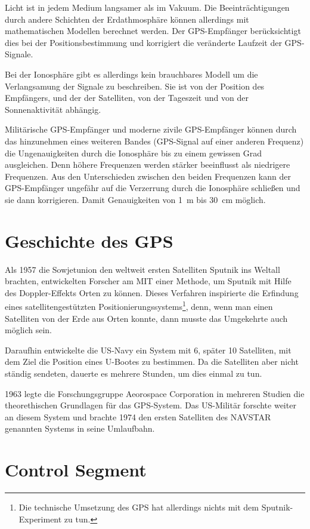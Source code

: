 \documentclass[12pt,a4paper]{scrartcl}
\begin{document}
Licht ist in jedem Medium langsamer als im Vakuum. Die Beeinträchtigungen durch andere Schichten der Erdathmosphäre können allerdings mit mathematischen Modellen berechnet werden. Der GPS-Empfänger berücksichtigt dies bei der Positionsbestimmung und korrigiert die veränderte Laufzeit der GPS-Signale.

Bei der Ionosphäre gibt es allerdings kein brauchbares Modell um die Verlangsamung der Signale zu beschreiben. Sie ist von der Position des Empfängers, und der der Satelliten, von der Tageszeit und von der Sonnenaktivität abhängig.

Militärische GPS-Empfänger und moderne zivile GPS-Empfänger können durch das hinzunehmen eines weiteren Bandes (GPS-Signal auf einer anderen Frequenz) die Ungenauigkeiten durch die Ionosphäre bis zu einem gewissen Grad ausgleichen. Denn höhere Frequenzen werden stärker beeinflusst als niedrigere Frequenzen. Aus den Unterschieden zwischen den beiden Frequenzen kann der GPS-Empfänger ungefähr auf die Verzerrung durch die Ionosphäre schließen und sie dann korrigieren. Damit Genauigkeiten von \SI{1}{\meter} bis \SI{30}{\centi\meter} möglich.

\section{Geschichte des GPS}
\label{sec:history}
Als 1957 die Sowjetunion den weltweit ersten Satelliten Sputnik ins Weltall brachten, entwickelten Forscher am MIT einer Methode, um Sputnik mit Hilfe des Doppler-Effekts Orten zu können. Dieses Verfahren inspirierte die Erfindung eines satellitengestützten Positionierungssystems\footnote{Die technische Umsetzung des GPS hat allerdings nichts mit dem Sputnik-Experiment zu tun.}, denn, wenn man einen Satelliten von der Erde aus Orten konnte, dann musste das Umgekehrte auch möglich sein.\cite{tomtom_history}

Daraufhin entwickelte die US-Navy ein System mit 6, später 10 Satelliten, mit dem Ziel die Position eines U-Bootes zu bestimmen. Da die Satelliten aber nicht ständig sendeten, dauerte es mehrere Stunden, um dies einmal zu tun.\cite{techhive_history}

1963 legte die Forschungsgruppe Aeorospace Corporation in mehreren Studien die theorethischen Grundlagen für das GPS-System. Das US-Militär forschte weiter an diesem System und brachte 1974 den ersten Satelliten des NAVSTAR genannten Systems in seine Umlaufbahn.

\section{Control Segment}
\label{sec:control}
\end{document}
